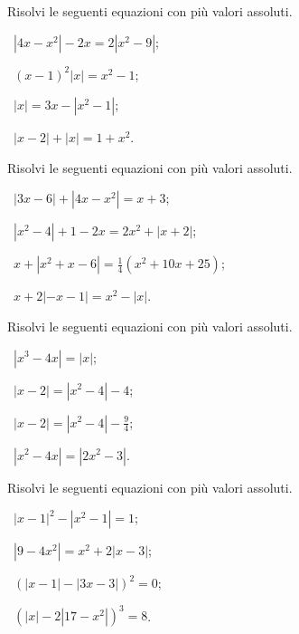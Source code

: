\begin{esercizio}[\Ast]
 \label{ese:7.20}
Risolvi le seguenti equazioni con più valori assoluti.
\begin{multicols}{2}
 \begin{enumeratea}
 \item~$\left|4x-x^2\right|-2x=2\left|x^2-9\right|$;
 \item~$(x-1)^2\left|x\right|=x^2-1$;
 \item~$\left|x\right|=3x-\left|x^2-1\right|$;
 \item~$\left|x-2\right|+\left|x\right|=1+x^2$.
 \end{enumeratea}
 \end{multicols}
\end{esercizio}

\begin{esercizio}[\Ast]
 \label{ese:7.21}
Risolvi le seguenti equazioni con più valori assoluti.
\begin{multicols}{2}
 \begin{enumeratea}
 \item~$\left|3x-6\right|+\left|4x-x^2\right|=x+3$;
 \item~$\left|x^2-4\right|+1-2x=2x^2+\left|x+2\right|$;
 \item~$x+\left|x^2+x-6\right|=\frac 1 4(x^2+10x+25)$;
 \item~$x+2\left|-x-1\right|=x^2-\left|x\right|$.
 \end{enumeratea}
 \end{multicols}
\end{esercizio}

\begin{esercizio}[\Ast]
 \label{ese:7.22}
Risolvi le seguenti equazioni con più valori assoluti.
\begin{multicols}{2}
 \begin{enumeratea}
 \item~$\left|x^3-4x\right|=\left|x\right|$;
 \item~$\left|x-2\right|=\left|x^2-4\right|-4$;
 \item~$\left|x-2\right|=\left|x^2-4\right|-\frac 9 4$;
 \item~$\left|x^2-4x\right|=\left|2x^2-3\right|$.
 \end{enumeratea}
 \end{multicols}
\end{esercizio}

\begin{esercizio}[\Ast]
 \label{ese:7.23}
Risolvi le seguenti equazioni con più valori assoluti.
\begin{multicols}{2}
 \begin{enumeratea}
 \item~$\left|x-1\right|^2-\left|x^2-1\right|=1$;
 \item~$\left|9-4x^2\right|=x^2+2\left|x-3\right|$;
 \item~$(\left|x-1\right|-\left|3x-3\right|)^2=0$;
 \item~$\left(\left|x\right|-2\left|17-x^2\right|\right)^3=8$.
 \end{enumeratea}
 \end{multicols}
\end{esercizio}

